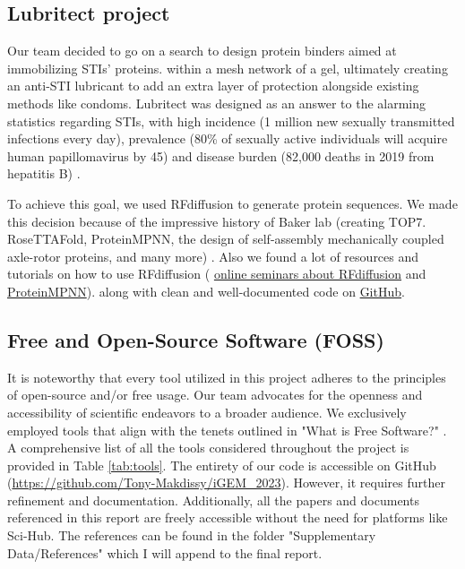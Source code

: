 \documentclass[11pt,a4paper]{article}
\begin{document}
\subsection{Lubritect project}

Our team decided to go on a search to design protein binders aimed at immobilizing STIs' proteins.
within a mesh network of a gel, ultimately creating an anti-STI lubricant to add an extra layer of protection alongside 
existing methods like condoms. 
Lubritect was designed
as an answer to the alarming statistics regarding STIs, with high incidence 
(1 million new sexually transmitted infections every day), 
prevalence (80\% of sexually active individuals will acquire human papillomavirus by 45)
and disease burden (82,000 deaths in 2019 from hepatitis B) \cite{paris_bettencourt_project}.

To achieve this goal, we used RFdiffusion to generate protein 
sequences. We made this decision because of the impressive history of
Baker lab (creating TOP7. RoseTTAFold, ProteinMPNN, the design
of self-assembly mechanically coupled axle-rotor proteins, and many more) \cite{bakerlab}.
Also we found a lot of resources and tutorials on how to use RFdiffusion (
\href{https://www.youtube.com/watch?v=wIHwHDt2NoI}{online seminars about RFdiffusion} and 
\href{https://youtu.be/aVQQuoToTJA?si=PnQvJluY3ZPHo4TO}{ProteinMPNN}).
along with clean and well-documented code on \href{https://github.com/RosettaCommons/RFdiffusion}{GitHub}.

\subsection{Free and Open-Source Software (FOSS)}

It is noteworthy that every tool utilized in this project adheres to the principles of open-source and/or free usage. Our team advocates for the openness and accessibility of scientific endeavors to a broader audience. We exclusively employed tools that align with the tenets outlined in "What is Free Software?" \cite{gun_foss}. A comprehensive list of all the tools considered throughout the project is provided in Table \ref{tab:tools}.
The entirety of our code is accessible on GitHub (\url{https://github.com/Tony-Makdissy/iGEM_2023}). However, it requires further refinement and documentation.
Additionally, all the papers and documents referenced in this report are freely accessible without the need for platforms like Sci-Hub. The references can be found in the folder "Supplementary Data/References" which I will append to the final report.
\end{document}
